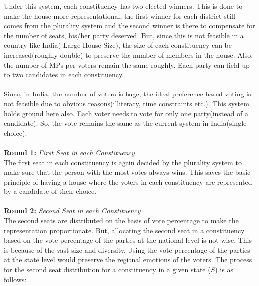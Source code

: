\documentclass{article}
\begin{document}
Under this system, each constituency has two elected winners. This is done to make the house more representational, the first winner for each district still comes from the plurality system and the second winner is there to compensate for the number of seats, his/her party deserved. But, since this is not feasible in a country like India( Large House Size), the size of each constituency can be increased(roughly double) to preserve the number of members in the house. Also, the number of MPs per voters remain the same roughly. Each party can field up to two candidates in each constituency. \\ \\
Since, in India, the number of voters is huge, the ideal preference based voting is not feasible due to obvious reasons(illiteracy, time constraints etc.). This system holds ground here also. Each voter needs to vote for only one party(instead of a candidate). So, the vote remains the same as the current system in India(single choice). \\ \\
\textbf{Round 1:} \emph{First Seat in each Constituency} \\
The first seat in each constituency is again decided by the plurality system to make sure that the person with the most votes always wins. This saves the basic principle of having a house where the voters in each constituency are represented by a candidate of their choice.\\ \\
\textbf{Round 2:} \emph{Second Seat in each Constituency} \\
The second seats are distributed on the basis of vote percentage to make the representation proportionate. But, allocating the second seat in a constituency based on the vote percentage of the parties at the national level is not wise. This is because of the vast size and diversity. Using the vote percentage of the parties at the state level would preserve the regional emotions of the voters. The process for the second seat distribution for a constituency in a given state ($S$) is as follows:
\end{document}
